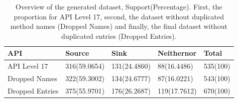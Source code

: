 \begin{table}[h!]
    \centering
    \renewcommand{\arraystretch}{1.8}
    \begin{tabular}{ |p{3cm}|p{2.5cm}p{2.5cm}p{2.5cm}p{2cm}| }
        \hline
        API & Source & Sink & Neithernor & Total\\
        \hline
        API Level 17 & 316(59.0654) & 131(24.4860) & 88(16.4486) & 535(100)\\
        Dropped Names & 322(59.3002) & 134(24.6777) & 87(16.0221) & 543(100)\\
        Dropped Entries & 375(55.9701) & 176(26.2687) & 119(17.7612) & 670(100)\\ [1ex]
        \hline
        \end{tabular}
        \caption{%
        Overview of the generated dataset, Support(Percentage). First, the proportion for API Level 17, second, the dataset without duplicated method names (Dropped Names) and finally, the final dataset without duplicated entries (Dropped Entries).%
        }\label{dset_prop}
\end{table}



